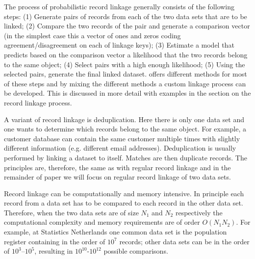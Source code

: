 The process of probabilistic record linkage generally consists of the following steps: (1) Generate
pairs of records from each of the two data sets that are to be linked; (2) Compare the two records
of the pair and generate a comparison vector (in the simplest case this a vector of ones and zeros
coding agreement/disagreement on each of linkage keys); (3) Estimate a model that predicts based on
the comparison vector a likelihood that the two records belong to the same object; (4) Select pairs
with a high enough likelihood; (5) Using the selected pairs, generate the final linked dataset. 
 offers different methods for most of these steps and by mixing the different methods a
custom linkage process can be developed. This is discussed in more detail with examples in the
section on the record linkage process.

A variant of record linkage is deduplication. Here there is only one data set and one wants to
determine which records belong to the same object. For example, a customer database can contain the
same customer multiple times with slightly different information (e.g. different email addresses).
Deduplication is usually performed by linking a dataset to itself. Matches are then duplicate
records. The principles are, therefore, the same as with regular record linkage and in the remainder
of paper we will focus on regular record linkage of two data sets. 

Record linkage can be computationally and memory intensive. In principle each record from a data
set has to be compared to each record in the other data set. Therefore, when the two data sets are
of size $N_1$ and $N_2$ respectively the computational complexity and memory requirements are of
order $O(N_1 N_2)$. For example, at Statistics Netherlands one common data set is the population
register containing in the order of $10^7$ records; other data sets  can be in the order of
$10^3$--$10^5$, resulting in $10^{10}$-$10^{12}$ possible comparisons.


